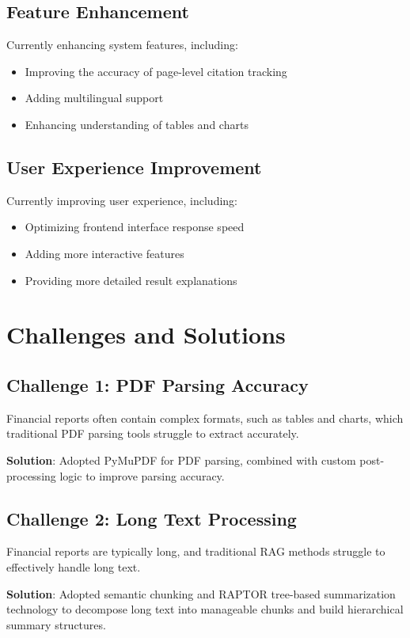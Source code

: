 \documentclass[12pt, a4paper]{article}
\begin{document}
\subsection{Feature Enhancement}
Currently enhancing system features, including:
\begin{itemize}
    \item Improving the accuracy of page-level citation tracking
    \item Adding multilingual support
    \item Enhancing understanding of tables and charts
\end{itemize}

\subsection{User Experience Improvement}
Currently improving user experience, including:
\begin{itemize}
    \item Optimizing frontend interface response speed
    \item Adding more interactive features
    \item Providing more detailed result explanations
\end{itemize}

\section{Challenges and Solutions}

\subsection{Challenge 1: PDF Parsing Accuracy}
Financial reports often contain complex formats, such as tables and charts,
which traditional PDF parsing tools struggle to extract accurately.

\textbf{Solution}: Adopted PyMuPDF for PDF parsing, combined with custom post-processing logic to improve parsing accuracy.

\subsection{Challenge 2: Long Text Processing}
Financial reports are typically long, and traditional RAG methods struggle to
effectively handle long text.

\textbf{Solution}: Adopted semantic chunking and RAPTOR tree-based summarization technology to decompose long text into manageable chunks and build hierarchical summary structures.
\end{document}
